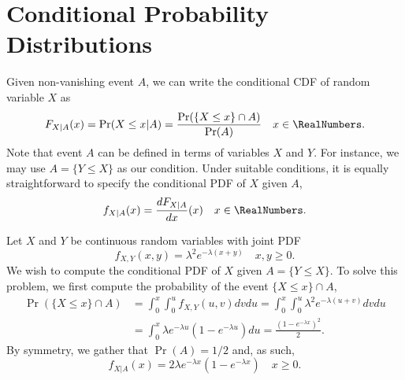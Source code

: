 \section{Conditional Probability Distributions}

Given non-vanishing event $A$, we can write the conditional CDF of random variable $X$ as
\begin{equation*}
F_{X|A} (x) = \Pr (X \leq x | A)
= \frac{ \Pr ( \{ X \leq x \} \cap A ) }{\Pr(A)} \quad x \in \RealNumbers .
\end{equation*}
Note that event $A$ can be defined in terms of variables $X$ and $Y$.
For instance, we may use $A = \{ Y \leq X \}$ as our condition.
Under suitable conditions, it is equally straightforward to specify the conditional PDF of $X$ given $A$,
\begin{equation*}
f_{X|A} (x) = \frac{d F_{X|A}}{dx} (x) \quad x \in \RealNumbers .
\end{equation*}

\begin{example}
Let $X$ and $Y$ be continuous random variables with joint PDF
\begin{equation*}
f_{X,Y} (x,y) = \lambda^2 e^{-\lambda (x + y)} \quad x,y \geq 0 .
\end{equation*}
We wish to compute the conditional PDF of $X$ given $A = \{ Y \leq X \}$.
To solve this problem, we first compute the probability of the event $\{ X \leq x \} \cap A$,
\begin{equation*}
\begin{split}
\Pr ( \{ X \leq x \} \cap A )
&= \int_0^x \int_0^{u} f_{X,Y} (u, v) dv du
= \int_0^x \int_0^{u} \lambda^2 e^{-\lambda (u + v)} dv du \\
&= \int_0^x \lambda e^{- \lambda u} \left( 1 - e^{- \lambda u} \right) du
= \frac{ \left( 1 - e^{-\lambda x} \right)^2 }{2} .
\end{split}
\end{equation*}
By symmetry, we gather that $\Pr(A) = 1/2$ and, as such,
\begin{equation*}
f_{X | A} (x) = 2 \lambda e^{-\lambda x} \left( 1 - e^{-\lambda x} \right)
\quad x \geq 0 .
\end{equation*}
\end{example}

